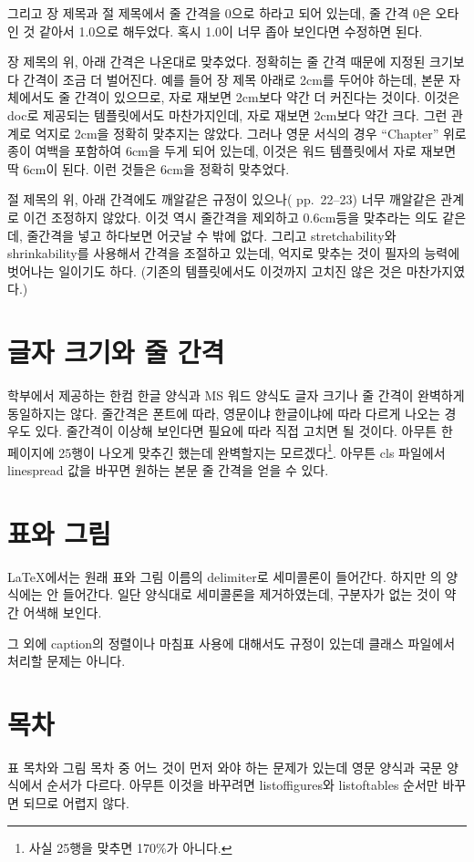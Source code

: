 \documentclass[a4paper]{report}
\begin{document}
그리고 장 제목과 절 제목에서 줄 간격을 0으로 하라고
되어 있는데, 줄 간격 0은 오타인 것 같아서
1.0으로 해두었다. 혹시 1.0이 너무 좁아
보인다면 수정하면 된다.

장 제목의 위, 아래 간격은 나온대로 맞추었다.
정확히는 줄 간격 때문에 지정된 크기보다
간격이 조금 더 벌어진다. 예를 들어
장 제목 아래로 2cm를 두어야 하는데,
본문 자체에서도 줄 간격이 있으므로,
자로 재보면 2cm보다 약간 더 커진다는
것이다. 이것은 doc로 제공되는 템플릿에서도
마찬가지인데, 자로 재보면 2cm보다 약간 크다.
그런 관계로 억지로 2cm을 정확히 맞추지는 않았다.
그러나 영문 서식의 경우 ``Chapter'' 위로
종이 여백을 포함하여 6cm을 두게 되어 있는데,
이것은 워드 템플릿에서 자로 재보면
딱 6cm이 된다. 이런 것들은 6cm을 정확히 맞추었다.

절 제목의 위, 아래 간격에도 깨알같은 규정이
있으나(\cite{grad} pp.~22--23) 너무 깨알같은 관계로 이건 조정하지 않았다.
이것 역시 줄간격을 제외하고 0.6cm등을 맞추라는 의도
같은데, 줄간격을 넣고 하다보면 어긋날 수 밖에 없다.
그리고  stretchability와 shrinkability를
사용해서 간격을 조절하고 있는데, 억지로 맞추는
것이 필자의 능력에 벗어나는 일이기도 하다.
(기존의 템플릿에서도 이것까지 고치진
않은 것은 마찬가지였다.)

\section{글자 크기와 줄 간격}
학부에서 제공하는 한컴 한글 양식과 MS 워드 양식도
글자 크기나 줄 간격이 완벽하게 동일하지는 않다.
줄간격은 폰트에 따라, 영문이냐 한글이냐에 따라
다르게 나오는 경우도 있다. 줄간격이 이상해 보인다면
필요에 따라 직접 고치면 될 것이다.
아무튼 한 페이지에 25행이 나오게 맞추긴
했는데 완벽할지는 모르겠다\footnote{사실
25행을 맞추면 170\%가 아니다.}.
아무튼 cls 파일에서 linespread 값을
바꾸면 원하는 본문 줄 간격을
얻을 수 있다.

\section{표와 그림}
LaTeX에서는 원래 표와 그림 이름의 delimiter로 세미콜론이 들어간다.
하지만 \cite{grad}의 양식에는 안 들어간다.
일단 양식대로 세미콜론을 제거하였는데,
구분자가 없는 것이 약간 어색해 보인다.

그 외에 caption의 정렬이나 마침표 사용에 대해서도
규정이 있는데 클래스 파일에서 처리할 문제는 아니다.

\section{목차}
표 목차와 그림 목차 중 어느 것이 먼저 와야 하는
문제가 있는데 영문 양식과 국문 양식에서 순서가 다르다.
아무튼 이것을 바꾸려면 listoffigures와 listoftables
순서만 바꾸면 되므로 어렵지 않다.
\end{document}
